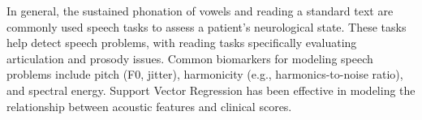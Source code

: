 In general, the sustained phonation of vowels and reading a standard text are commonly used speech tasks to assess a patient’s neurological state. These tasks help detect speech problems, with reading tasks specifically evaluating articulation and prosody issues. Common biomarkers for modeling speech problems include pitch (F0, jitter), harmonicity (e.g., harmonics-to-noise ratio), and spectral energy. Support Vector Regression has been effective in modeling the relationship between acoustic features and clinical scores.
